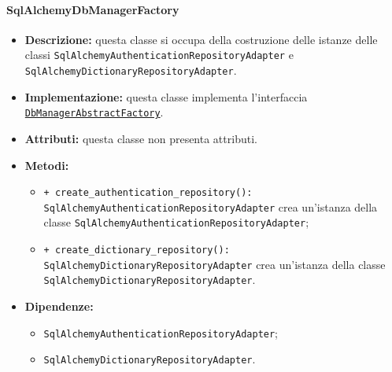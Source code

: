 \paragraph{SqlAlchemyDbManagerFactory} \label{SqlAlchemyDbManagerFactory}
\begin{itemize}
    \item \textbf{Descrizione:} questa classe si occupa della costruzione delle istanze delle classi \texttt{SqlAlchemyAuthenticationRepositoryAdapter} e \texttt{SqlAlchemyDictionaryRepositoryAdapter}.
    \item \textbf{Implementazione:} questa classe implementa l'interfaccia \hyperref[DbManagerAbstractFactory]{\texttt{DbManagerAbstractFactory}}.
    \item \textbf{Attributi:} questa classe non presenta attributi.
    \item \textbf{Metodi:}
    \begin{itemize}
        \item \texttt{+ create\_authentication\_repository(): SqlAlchemyAuthenticationRepositoryAdapter} crea un'istanza della classe \texttt{SqlAlchemyAuthenticationRepositoryAdapter};
        \item \texttt{+ create\_dictionary\_repository(): SqlAlchemyDictionaryRepositoryAdapter} crea un'istanza della classe \texttt{SqlAlchemyDictionaryRepositoryAdapter}.
    \end{itemize}
    \item \textbf{Dipendenze:}
    \begin{itemize}
        \item \texttt{SqlAlchemyAuthenticationRepositoryAdapter};
        \item \texttt{SqlAlchemyDictionaryRepositoryAdapter}.
    \end{itemize}
\end{itemize}


